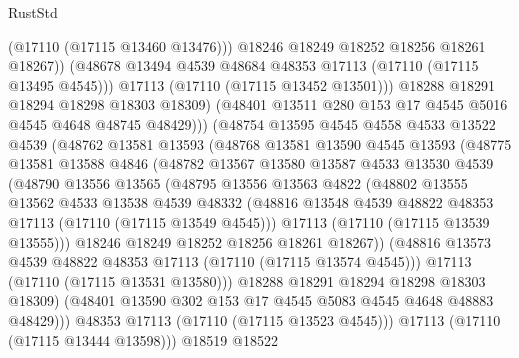 \begin{lexlean}{RustStd}
\begin{coremodule}
                        (@17110 (@17115 @13460 @13476)))
                      @18246
                      @18249
                      @18252
                      @18256
                      @18261
                      @18267))
                  (@48678 @13494 @4539 @48684 @48353 @17113 (@17110 (@17115 @13495 @4545)))
                  @17113
                  (@17110 (@17115 @13452 @13501)))
                @18288
                @18291
                @18294
                @18298
                @18303
                @18309)
              (@48401 @13511 @280 @153 @17 @4545 @5016 @4545 @4648 @48745 @48429)))
          (@48754
            @13595
            @4545
            @4558
            @4533
            @13522
            @4539
            (@48762
              @13581
              @13593
              (@48768
                @13581
                @13590
                @4545
                @13593
                (@48775
                  @13581
                  @13588
                  @4846
                  (@48782
                    @13567
                    @13580
                    @13587
                    @4533
                    @13530
                    @4539
                    (@48790
                      @13556
                      @13565
                      (@48795
                        @13556
                        @13563
                        @4822
                        (@48802
                          @13555
                          @13562
                          @4533
                          @13538
                          @4539
                          @48332
                          (@48816 @13548 @4539 @48822 @48353 @17113 (@17110 (@17115 @13549 @4545)))
                          @17113
                          (@17110 (@17115 @13539 @13555)))
                        @18246
                        @18249
                        @18252
                        @18256
                        @18261
                        @18267))
                    (@48816 @13573 @4539 @48822 @48353 @17113 (@17110 (@17115 @13574 @4545)))
                    @17113
                    (@17110 (@17115 @13531 @13580)))
                  @18288
                  @18291
                  @18294
                  @18298
                  @18303
                  @18309)
                (@48401 @13590 @302 @153 @17 @4545 @5083 @4545 @4648 @48883 @48429)))
            @48353
            @17113
            (@17110 (@17115 @13523 @4545)))
          @17113
          (@17110 (@17115 @13444 @13598)))
        @18519
        @18522

\end{coremodule}
\end{lexlean}
